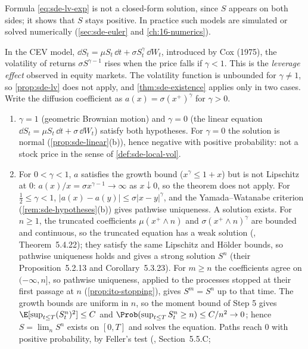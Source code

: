 Formula \eqref{eq:sde-lv-exp} is not a closed-form solution, since $S$ appears on both
sides; it shows that $S$ stays positive. In practice such models are simulated or solved
numerically (\cref{sec:sde-euler} and \cref{ch:16-numerics}).

\begin{example}\label{exa:sde-cev}
In the CEV model, $\dd S_t=\mu S_t\,\dd t+\sigma S_t^\gamma\,\dd W_t$, introduced by Cox
(1975), the volatility of returns $\sigma S^{\gamma-1}$ rises when the price falls if
$\gamma<1$. This is the \emph{leverage effect} observed in equity markets. The volatility function is unbounded for
$\gamma\ne1$, so \cref{prop:sde-lv} does not apply, and \cref{thm:sde-existence} applies only
in two cases. Write the diffusion coefficient as $a(x)=\sigma(x^+)^\gamma$ for $\gamma>0$.
\begin{enumerate}[label=(\alph*)]
  \item $\gamma=1$ (geometric Brownian motion) and $\gamma=0$ (the linear equation
    $\dd S_t=\mu S_t\,\dd t+\sigma\,\dd W_t$) satisfy both hypotheses. For $\gamma=0$ the
    solution is normal (\cref{prop:sde-linear}(b)), hence negative with positive probability:
    not a stock price in the sense of \cref{def:sde-local-vol}.
  \item For $0<\gamma<1$, $a$ satisfies the growth bound ($x^\gamma\le1+x$) but is not
    Lipschitz at $0$: $a(x)/x=\sigma x^{\gamma-1}\to\infty$ as $x\downarrow0$, so the
    theorem does not apply. For $\frac12\le\gamma<1$, $|a(x)-a(y)|\le\sigma|x-y|^\gamma$,
    and the Yamada--Watanabe criterion (\cref{rem:sde-hypotheses}(b)) gives pathwise
    uniqueness. A solution exists. For $n\ge1$, the truncated coefficients $\mu(x^+\wedge n)$
    and $\sigma(x^+\wedge n)^\gamma$ are bounded and continuous, so the truncated equation has
    a weak solution (\textcite{karatzas-shreve}, Theorem~5.4.22); they satisfy the same
    Lipschitz and H\"older bounds, so pathwise uniqueness holds and gives a strong solution
    $S^n$ (their Proposition~5.2.13 and Corollary~5.3.23). For $m\ge n$ the coefficients agree
    on $(-\infty,n]$, so pathwise uniqueness, applied to the processes stopped at their first
    passage at $n$ (\cref{prop:ito-stopping}), gives $S^m=S^n$ up to that time. The growth
    bounds are uniform in $n$, so the moment bound of Step 5 gives
    $\E[\sup_{t\le T}(S^n_t)^2]\le C$ and $\Prob(\sup_{t\le T}S^n_t\ge n)\le C/n^2\to0$; hence
    $S=\lim_nS^n$ exists on $[0,T]$ and solves the equation. Paths reach $0$ with positive
    probability, by Feller's test (\textcite{karatzas-shreve}, Section~5.5.C;

\end{enumerate}
\end{example}
